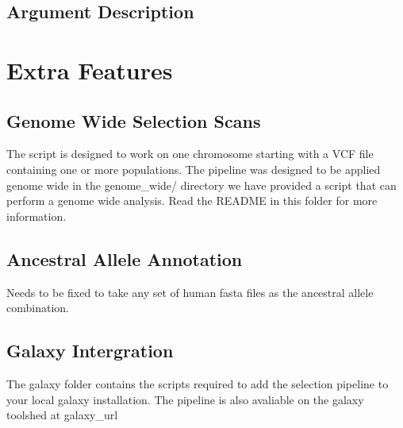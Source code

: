 \documentclass[a4paper,10pt]{article}
\begin{document}
\subsection{Argument Description}


\section{Extra Features}

\subsection{Genome Wide Selection Scans}
The script is designed to work on one chromosome starting with a VCF file containing one or more populations. The pipeline was designed to be applied genome wide in the genome\_wide/ directory we have provided a script that can perform a genome wide analysis. Read the README in this folder for more information.
\subsection{Ancestral Allele Annotation}
	Needs to be fixed to take any set of human fasta files as the ancestral allele combination.
\subsection{Galaxy Intergration}
The galaxy folder contains the scripts required to add the selection pipeline to your local galaxy installation. The pipeline is also avaliable on the galaxy toolshed at galaxy\_url




\end{document}

